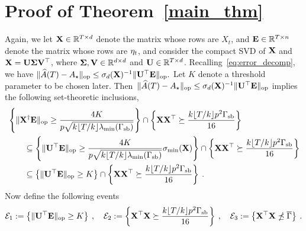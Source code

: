 

\section{Proof of Theorem~\ref{main_thm}\label{sec:mn_thm_proof}}

Again, we let
$\mathbf{X} \in \mathbb{R}^{T \times d}$ denote the matrix whose rows are $X_t$, and $\mathbf{E} \in \mathbb{R}^{T \times n}$ denote the matrix
whose rows are $\eta_t$, and consider the compact SVD of $\mathbf{X}$ and
$\mathbf{X} = \mathbf{U} \mathbf{\Sigma} \mathbf{V}^\top$, where $\mathbf{\Sigma},\mathbf{V} \in \mathbb{R}^{d \times d}$
and $\mathbf{U} \in \mathbb{R}^{T \times d}$. Recalling~\eqref{eq:error_decomp}, we have $\lVert \widehat{A}(T) - A_\star \rVert_{\mathrm{op}} \le \sigma_{d}(\mathbf{X})^{-1}\lVert \mathbf{U}^{\top}\mathbf{E} \rVert_{\mathrm{op}}.$
Let $K$ denote a threshold parameter to be chosen later.
Then~$\lVert \widehat{A}(T) - A_\star \rVert_{\mathrm{op}} \le \sigma_{d}(\mathbf{X})^{-1}\lVert \mathbf{U}^{\top}\mathbf{E} \rVert_{\mathrm{op}}$ implies the following set-theoretic inclusions,
\begin{align*}
  &\left\{ \lVert \mathbf{X}^{\dagger} \mathbf{E} \rVert_{\mathrm{op}} \geq \frac{4K}{p\sqrt{k\lfloor T/k\rfloor\lambda_{\min}(\Gamma_{\mathrm{sb}}) }} \right\} \cap \left\{ \mathbf{X}\mathbf{X}^{\top} \succeq \frac{k \lfloor T/k\rfloor p^2 \Gamma_{\mathrm{sb}}}{16} \right\} \\
  &\qquad \subseteq \left\{ \lVert \mathbf{U}^{\top} \mathbf{E} \rVert_{\mathrm{op}} \geq \frac{4K}{p\sqrt{k\lfloor T/k\rfloor\lambda_{\min}(\Gamma_{\mathrm{sb}}) }} \sigma_{\min}(\mathbf{X})  \right\}\cap \left\{ \mathbf{X}\mathbf{X}^{\top} \succeq \frac{k \lfloor T/k\rfloor p^2 \Gamma_{\mathrm{sb}}}{16} \right\} \\
  &\qquad \subseteq \left\{ \lVert \mathbf{U}^{\top} \mathbf{E} \rVert_{\mathrm{op}} \geq K \right\} \cap \left\{ \mathbf{X}\mathbf{X}^{\top} \succeq \frac{k \lfloor T/k\rfloor p^2 \Gamma_{\mathrm{sb}}}{16} \right\} \:.
\end{align*}
Now define the following events
\begin{align*}
  \mathcal{E}_1 := \left\{ \lVert \mathbf{U}^{\top} \mathbf{E} \rVert_{\mathrm{op}} \geq K \right\} \:, \quad \mathcal{E}_2 := \left\{\mathbf{X}^\top \mathbf{X} \succeq \frac{k\lfloor T/k\rfloor p^2 \Gamma_{\mathrm{sb}} }{16}\right\} \:, \quad \mathcal{E}_3 := \left\{ \mathbf{X}^\top \mathbf{X}  \npreceq \overline{\Gamma} \right\} \:.
\end{align*}


